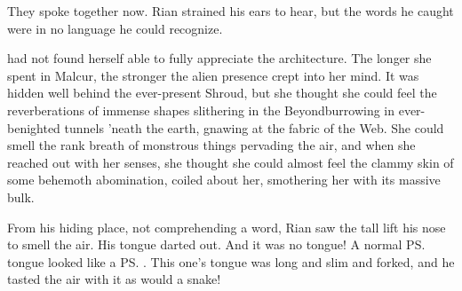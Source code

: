 \begin{garbage}
They spoke together now. 
Rian strained his ears to hear, but the words he caught were in no language he could recognize. 










\begin{comment}
\subsection{Black magic}
\end{comment}

\begin{comment}
\subsubsection{\Criseis}
\end{comment}
\new
{}


\Criseis{} had not found herself able to fully appreciate the architecture. The longer she spent in Malcur, the stronger the alien presence crept into her mind. 
It was hidden well behind the ever-present Shroud, but she thought she could feel the reverberations of immense shapes slithering in the Beyond\dash burrowing in ever-benighted tunnels 'neath the earth, gnawing at the fabric of the Web. She could smell the rank breath of monstrous things pervading the air, and when she reached out with her senses, she thought she could almost feel the clammy skin of some behemoth abomination, coiled about her, smothering her with its massive bulk. 







\begin{comment}
\subsubsection{Rian}
\end{comment}
\new
From his hiding place, not comprehending a word, Rian saw the tall \dax{} lift his nose to smell the air. 
His tongue darted out. 
And it was no \scathaese{} tongue! 
A normal \ps{\scatha} tongue looked like a \ps{\human}. 
This one's tongue was long and slim and forked, and he tasted the air with it as would a snake!


\end{garbage}
